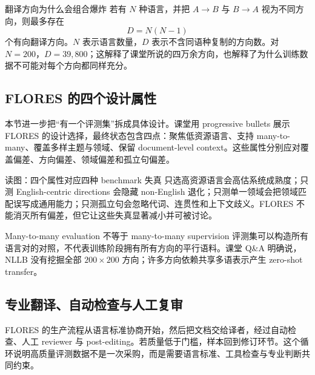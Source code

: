 \begin{importantbox}{翻译方向为什么会组合爆炸}
若有 $N$ 种语言，并把 $A\rightarrow B$ 与 $B\rightarrow A$ 视为不同方向，则最多存在
\[
D=N(N-1)
\]
个有向翻译方向。$N$ 表示语言数量，$D$ 表示不含同语种复制的方向数。对 $N=200$，$D=39{,}800$；这解释了课堂所说的四万余方向，也解释了为什么训练数据不可能对每个方向都同样充分。
\end{importantbox}

\subsection{FLORES 的四个设计属性}

本节进一步把“有一个评测集”拆成具体设计。课堂用 progressive bullets 展示 FLORES 的设计选择，最终状态包含四点：聚焦低资源语言、支持 many-to-many、覆盖多样主题与领域、保留 document-level context。这些属性分别应对覆盖偏差、方向偏差、领域偏差和孤立句偏差。


\begin{knowledgebox}{读图：四个属性对应四种 benchmark 失真}
只选高资源语言会高估系统成熟度；只测 English-centric directions 会隐藏 non-English 退化；只测单一领域会把领域匹配误写成通用能力；只测孤立句会忽略代词、连贯性和上下文歧义。FLORES 不能消灭所有偏差，但它让这些失真显著减小并可被讨论。
\end{knowledgebox}

\begin{warningbox}{Many-to-many evaluation 不等于 many-to-many supervision}
评测集可以构造所有语言对的对照，不代表训练阶段拥有所有方向的平行语料。课堂 Q\&A 明确说，NLLB 没有挖掘全部 $200\times200$ 方向；许多方向依赖共享多语表示产生 zero-shot transfer。
\end{warningbox}

\subsection{专业翻译、自动检查与人工复审}

FLORES 的生产流程从语言标准协商开始，然后把文档交给译者，经过自动检查、人工 reviewer 与 post-editing。若质量低于门槛，样本回到修订环节。这个循环说明高质量评测数据不是一次采购，而是需要语言标准、工具检查与专业判断共同约束。


